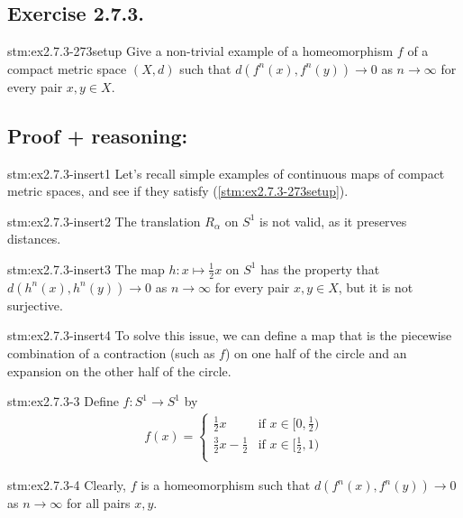 \subsection*{Exercise 2.7.3.}

\begin{exercise}{stm:ex2.7.3-273setup}
Give a non-trivial example of a homeomorphism $f$ of a compact metric space $(X,d)$ such that $d(f^n(x), f^n(y)) \to 0$ as $n \to \infty$ for every pair $x,y \in X$.
\end{exercise}

\subsection*{Proof {\color{blue}+ reasoning}:}

\begin{explanation}{stm:ex2.7.3-insert1}
Let's recall simple examples of continuous maps of compact metric spaces, and see if they satisfy (\ref{stm:ex2.7.3-273setup}).
\end{explanation}

\begin{explanation}{stm:ex2.7.3-insert2}
The translation $R_\alpha$ on $S^1$ is not valid, as it preserves distances.
\end{explanation}

\begin{explanation}{stm:ex2.7.3-insert3}
The map $h: x \mapsto \frac{1}{2}x$ on $S^1$ has the property that $d(h^n(x), h^n(y)) \to 0$ as $n \to \infty$ for every pair $x,y \in X$, but it is not surjective.
\end{explanation}

\begin{explanation}{stm:ex2.7.3-insert4}
To solve this issue, we can define a map that is the piecewise combination of a contraction (such as $f$) on one half of the circle and an expansion on the other half of the circle.
\end{explanation}

\begin{statement}{stm:ex2.7.3-3}
Define $f: S^1 \to S^1$ by
\begin{align*}
f(x) = 
\begin{cases}
\frac{1}{2}x & \text{if } x \in [0, \frac{1}{2}) \\
\frac{3}{2}x - \frac{1}{2} & \text{if } x \in [\frac{1}{2}, 1) \\
\end{cases}
\end{align*}
\end{statement}

\begin{statement}{stm:ex2.7.3-4}
Clearly, $f$ is a homeomorphism such that $d(f^n(x), f^n(y)) \to 0$ as $n \to \infty$ for all pairs $x, y$.
\end{statement}
